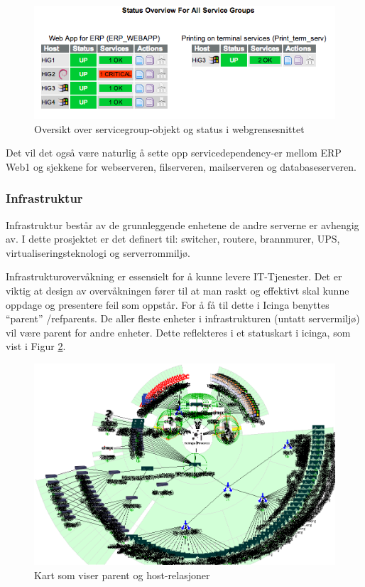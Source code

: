 \begin{figure}
    \centering
    \includegraphics[scale=0.6]{img/servicegroup_web}
    \caption{ Oversikt over servicegroup-objekt og status i webgrensesnittet}
    \label{servicegroup_web}
\end{figure}

Det vil det også være naturlig å sette opp servicedependency-er mellom ERP Web1 og sjekkene for webserveren, filserveren, mailserveren og databaseserveren.

\subsubsection{Infrastruktur}
Infrastruktur består av de grunnleggende enhetene de andre serverne er avhengig av. I dette prosjektet er det definert til: switcher, routere, brannmurer, UPS, virtualiseringsteknologi og serverrommiljø.

Infrastrukturovervåkning er essensielt for å kunne levere IT-Tjenester. Det er viktig at design av overvåkningen fører til at man raskt og effektivt skal kunne oppdage og presentere feil som oppstår. For å få til dette i Icinga benyttes “parent” /ref{parents}. De aller fleste enheter i infrastrukturen (untatt servermiljø) vil være parent for andre enheter. Dette reflekteres i et statuskart i icinga, som vist i Figur \ref{statusmap}.

\begin{figure}
    \centering
    \includegraphics[scale=0.6]{img/statusmap}
    \caption{Kart som viser parent og host-relasjoner}
    \label{statusmap}
\end{figure}


